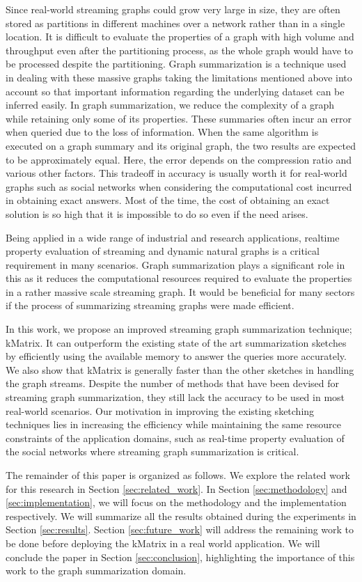 Since real-world streaming graphs could grow very large in size, they are often stored as partitions in different machines over a network rather than in a single location. It is difficult to evaluate the properties of a graph with high volume and throughput even after the partitioning process, as the whole graph would have to be processed despite the partitioning. Graph summarization is a technique used in dealing with these massive graphs taking the limitations mentioned above into account so that important information regarding the underlying dataset can be inferred easily. In graph summarization, we reduce the complexity of a graph while retaining only some of its properties. These summaries often incur an error when queried due to the loss of information. When the same algorithm is executed on a graph summary and its original graph, the two results are expected to be approximately equal. Here, the error depends on the compression ratio and various other factors. This tradeoff in accuracy is usually worth it for real-world graphs such as social networks when considering the computational cost incurred in obtaining exact answers. Most of the time, the cost of obtaining an exact solution is so high that it is impossible to do so even if the need arises. 

Being applied in a wide range of industrial and research applications, realtime property evaluation of streaming and dynamic natural graphs is a critical requirement in many scenarios. Graph summarization plays a significant role in this as it reduces the computational resources required to evaluate the properties in a rather massive scale streaming graph. It would be beneficial for many sectors if the process of summarizing streaming graphs were made efficient.

In this work, we propose an improved streaming graph summarization technique; kMatrix. It can outperform the existing state of the art summarization sketches by efficiently using the available memory to answer the queries more accurately. We also show that kMatrix is generally faster than the other sketches in handling the graph streams. Despite the number of methods that have been devised for streaming graph summarization, they still lack the accuracy to be used in most real-world scenarios\cite{kumarage_efficient_2017}. Our motivation in improving the existing sketching techniques lies in increasing the efficiency while maintaining the same resource constraints of the application domains, such as real-time property evaluation of the social networks where streaming graph summarization is critical. 

The remainder of this paper is organized as follows. We explore the related work for this research in Section \ref{sec:related_work}. In Section \ref{sec:methodology} and \ref{sec:implementation}, we will focus on the methodology and the implementation respectively. We will summarize all the results obtained during the experiments in Section \ref{sec:results}. Section \ref{sec:future_work} will address the remaining work to be done before deploying the kMatrix in a real world application. We will conclude the paper in Section \ref{sec:conclusion}, highlighting the importance of this work to the graph summarization domain. 